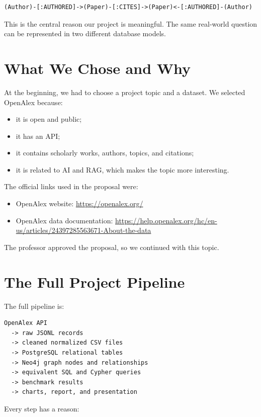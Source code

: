 \documentclass[11pt]{article}
\begin{document}
\begin{verbatim}
(Author)-[:AUTHORED]->(Paper)-[:CITES]->(Paper)<-[:AUTHORED]-(Author)
\end{verbatim}

This is the central reason our project is meaningful.
The same real-world question can be represented in two different database models.

\section{What We Chose and Why}

At the beginning, we had to choose a project topic and a dataset.
We selected OpenAlex because:

\begin{itemize}
    \item it is open and public;
    \item it has an API;
    \item it contains scholarly works, authors, topics, and citations;
    \item it is related to AI and RAG, which makes the topic more interesting.
\end{itemize}

The official links used in the proposal were:

\begin{itemize}
    \item OpenAlex website: \url{https://openalex.org/}
    \item OpenAlex data documentation: \url{https://help.openalex.org/hc/en-us/articles/24397285563671-About-the-data}
\end{itemize}

The professor approved the proposal, so we continued with this topic.

\section{The Full Project Pipeline}

The full pipeline is:

\begin{verbatim}
OpenAlex API
  -> raw JSONL records
  -> cleaned normalized CSV files
  -> PostgreSQL relational tables
  -> Neo4j graph nodes and relationships
  -> equivalent SQL and Cypher queries
  -> benchmark results
  -> charts, report, and presentation
\end{verbatim}

Every step has a reason:
\end{document}

